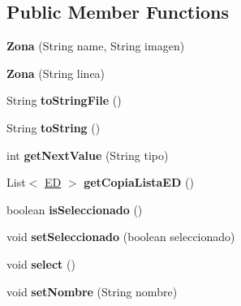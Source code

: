 \subsection*{Public Member Functions}
\begin{DoxyCompactItemize}
\item 
\mbox{\label{classmodelo_1_1_zona_a1be4bcab3ca76125a2ab065bb4d79114}} 
{\bfseries Zona} (String name, String imagen)
\item 
\mbox{\label{classmodelo_1_1_zona_a0866956d21be4423b0a4b6292b349f6e}} 
{\bfseries Zona} (String linea)
\item 
\mbox{\label{classmodelo_1_1_zona_a1697e1ce1aaa4574a30e6519546bf214}} 
String {\bfseries to\+String\+File} ()
\item 
\mbox{\label{classmodelo_1_1_zona_a5e285ed339ef7daee4021c7cab1bcac4}} 
String {\bfseries to\+String} ()
\item 
\mbox{\label{classmodelo_1_1_zona_aa7241417dbf1153844826e19e9be1112}} 
int {\bfseries get\+Next\+Value} (String tipo)
\item 
\mbox{\label{classmodelo_1_1_zona_ab133c3ea1a52d41ab1cd9aa2401f68f6}} 
List$<$ \mbox{\hyperlink{classmodelo_1_1_e_d}{ED}} $>$ {\bfseries get\+Copia\+Lista\+ED} ()
\item 
\mbox{\label{classmodelo_1_1_zona_a6a050ef3f3fe96afa0c56f1e20a4ef94}} 
boolean {\bfseries is\+Seleccionado} ()
\item 
\mbox{\label{classmodelo_1_1_zona_a5dfc8daf37a79588971bee64ceef3ca4}} 
void {\bfseries set\+Seleccionado} (boolean seleccionado)
\item 
\mbox{\label{classmodelo_1_1_zona_a60278d9bbe06d46adb967b8807bb648b}} 
void {\bfseries select} ()
\item 
\mbox{\label{classmodelo_1_1_zona_a704e259380ded00f46f28128ae223186}} 
void {\bfseries set\+Nombre} (String nombre)
\item 

\end{DoxyCompactItemize}
